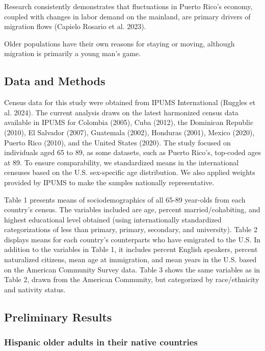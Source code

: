 \documentclass[
]{article}
\begin{document}
Research consistently demonstrates that fluctuations in Puerto Rico's
economy, coupled with changes in labor demand on the mainland, are
primary drivers of migration flows (Capielo Rosario et al. 2023).

Older populations have their own reasons for staying or moving, although
migration is primarily a young man's game.

\subsection{Data and Methods}\label{sec-methods}

Census data for this study were obtained from IPUMS International
(Ruggles et al. 2024). The current analysis draws on the latest
harmonized census data available in IPUMS for Colombia (2005), Cuba
(2012), the Dominican Republic (2010), El Salvador (2007), Guatemala
(2002), Honduras (2001), Mexico (2020), Puerto Rico (2010), and the
United States (2020). The study focused on individuals aged 65 to 89, as
some datasets, such as Puerto Rico's, top-coded ages at 89. To ensure
comparability, we standardized means in the international censuses based
on the U.S. sex-specific age distribution. We also applied weights
provided by IPUMS to make the samples nationally representative.

Table 1 presents means of sociodemographics of all 65-89 year-olds from
each country's census. The variables included are age, percent
married/cohabiting, and highest educational level obtained (using
internationally standardized categorizations of less than primary,
primary, secondary, and university). Table 2 displays means for each
country's counterparts who have emigrated to the U.S. In addition to the
variables in Table 1, it includes percent English speakers, percent
naturalized citizens, mean age at immigration, and mean years in the
U.S. based on the American Community Survey data. Table 3 shows the same
variables as in Table 2, drawn from the American Community, but
categorized by race/ethnicity and nativity status.

\subsection{Preliminary Results}\label{preliminary-results}

\subsubsection{Hispanic older adults in their native
countries}\label{hispanic-older-adults-in-their-native-countries}
\end{document}
